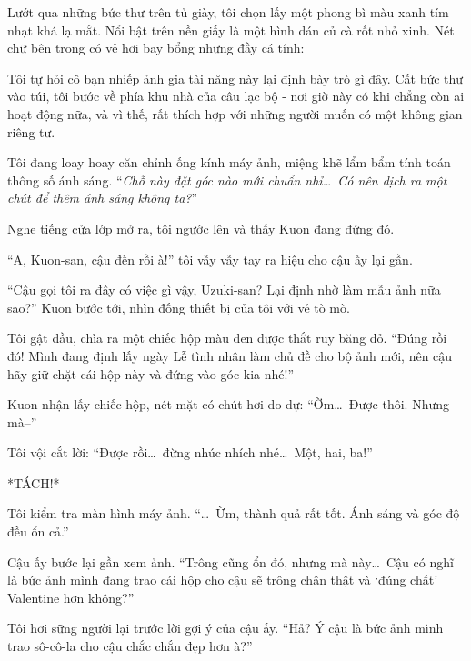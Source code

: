 \documentclass[../main.tex]{subfiles}
\begin{document}
\newpage
\label{uzuki}

Lướt qua những bức thư trên tủ giày, tôi chọn lấy một phong bì màu xanh tím nhạt khá lạ mắt. Nổi bật trên nền giấy là một hình dán củ cà rốt nhỏ xinh. Nét chữ bên trong có vẻ hơi bay bổng nhưng đầy cá tính:


Tôi tự hỏi cô bạn nhiếp ảnh gia tài năng này lại định bày trò gì đây. Cất bức thư vào túi, tôi bước về phía khu nhà của câu lạc bộ - nơi giờ này có khi chẳng còn ai hoạt động nữa, và vì thế, rất thích hợp với những người muốn có một không gian riêng tư.

\ct


Tôi đang loay hoay căn chỉnh ống kính máy ảnh, miệng khẽ lẩm bẩm tính toán thông số ánh sáng. ``\textit{Chỗ này đặt góc nào mới chuẩn nhỉ\dots\ Có nên dịch ra một chút để thêm ánh sáng không ta?}''

Nghe tiếng cửa lớp mở ra, tôi ngước lên và thấy Kuon đang đứng đó.

``A, Kuon-san, cậu đến rồi à!'' tôi vẫy vẫy tay ra hiệu cho cậu ấy lại gần.

``Cậu gọi tôi ra đây có việc gì vậy, Uzuki-san? Lại định nhờ làm mẫu ảnh nữa sao?'' Kuon bước tới, nhìn đống thiết bị của tôi với vẻ tò mò.

Tôi gật đầu, chìa ra một chiếc hộp màu đen được thắt ruy băng đỏ. ``Đúng rồi đó! Mình đang định lấy ngày Lễ tình nhân làm chủ đề cho bộ ảnh mới, nên cậu hãy giữ chặt cái hộp này và đứng vào góc kia nhé!''

Kuon nhận lấy chiếc hộp, nét mặt có chút hơi do dự: ``Ờm\dots\ Được thôi. Nhưng mà--''

Tôi vội cắt lời: ``Được rồi\dots\ đừng nhúc nhích nhé\dots\ Một, hai, ba!''

*TÁCH!*

Tôi kiểm tra màn hình máy ảnh. ``\dots\ Ừm, thành quả rất tốt. Ánh sáng và góc độ đều ổn cả.''

Cậu ấy bước lại gần xem ảnh. ``Trông cũng ổn đó, nhưng mà này\dots\ Cậu có nghĩ là bức ảnh mình đang trao cái hộp cho cậu sẽ trông chân thật và `đúng chất' Valentine hơn không?''

Tôi hơi sững người lại trước lời gợi ý của cậu ấy. ``Hả? Ý cậu là bức ảnh mình trao sô-cô-la cho cậu chắc chắn đẹp hơn à?''
\end{document}
